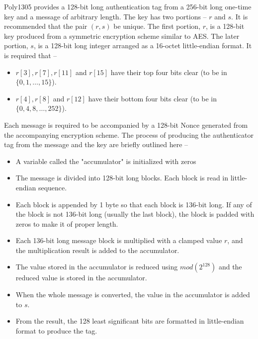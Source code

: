 \documentclass[a4paper]{cas-sc}
\begin{document}
Poly1305 provides a 128-bit long authentication tag from a 256-bit long one-time key and a message of arbitrary length. The key has two portions -- $r$ and $s$. It is recommended that the pair $(r,s)$ be unique. The first portion, $r$, is a 128-bit key produced from a symmetric encryption scheme similar to AES. The later portion, $s$, is a 128-bit long integer arranged as a 16-octet little-endian format. It is required that --
\begin{itemize}
    \item $r[3], r[7], r[11]$ and $r[15]$ have their top four bits clear (to be in $\{0,1,\ldots,15\}$).
    \item $r[4], r[8]$ and $r[12]$ have their bottom four bits clear (to be in $\{0,4,8,\ldots,252\}$).
\end{itemize}

Each message is required to be accompanied by a 128-bit Nonce generated from the accompanying encryption scheme. The process of producing the authenticator tag from the message and the key are briefly outlined here --
\begin{itemize}
    \item A variable called the "accumulator" is initialized with zeros
    \item The message is divided into 128-bit long blocks. Each block is read in little-endian sequence.
    \item Each block is appended by 1 byte so that each block is 136-bit long. If any of the block is not 136-bit long (usually the last block), the block is padded with zeros to make it of proper length.
    \item Each 136-bit long message block is multiplied with a clamped value $r$, and the multiplication result is added to the accumulator.
    \item The value stored in the accumulator is reduced using $mod(2^{128})$ and the reduced value is stored in the accumulator.
    \item When the whole message is converted, the value in the accumulator is added to $s$.
    \item From the result, the 128 least significant bits are formatted in little-endian format to produce the tag.
\end{itemize}
\end{document}
